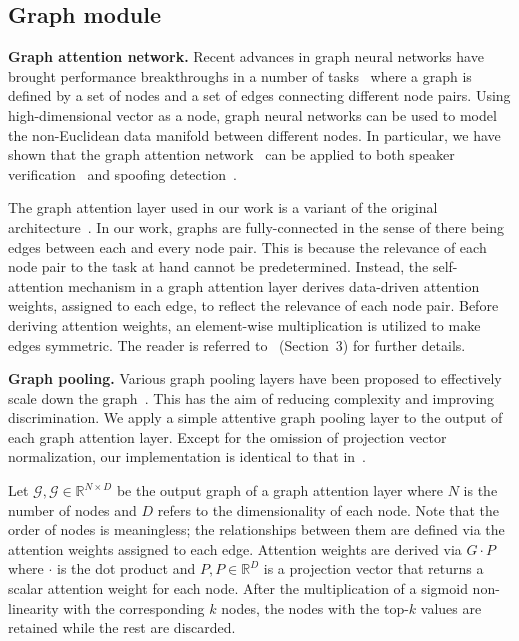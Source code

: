 \documentclass{article}
\newcommand{\newpara}[1]{\vspace{8pt}\noindent\textbf{#1}}
\begin{document}
\subsection{Graph module}
\label{sec:GATandGPool}

\newpara{Graph attention network.}
Recent advances in graph neural networks have brought performance breakthroughs in a number of tasks~\cite{velickovic2018graph,jung2021graph,tak2021graph} where a graph is defined by a set of nodes and a set of edges connecting different node pairs. 
Using high-dimensional vector as a node, graph neural networks can be used to model the non-Euclidean data manifold between different nodes.
In particular, we have shown that the graph attention network~\cite{velickovic2018graph} can be applied to both speaker verification~\cite{jung2021graph} and spoofing detection~\cite{tak2021graph, tak2021end}.

The graph attention layer used in our work is a variant of the original architecture~\cite{velickovic2018graph}.
In our work, graphs are fully-connected in the sense of there being edges between each and every node pair. 
This is because the relevance of each node pair to the task at hand cannot be predetermined. 
Instead, the self-attention mechanism in a graph attention layer derives data-driven attention weights, assigned to each edge, to reflect the relevance of each node pair. 
Before deriving attention weights, an element-wise multiplication is utilized to make edges symmetric.
The reader is referred to~\cite{tak2021end} (Section~3) for further details. 

\newpara{Graph pooling.}
Various graph pooling layers have been proposed to effectively scale down the graph~\cite{lee2019self,gao2019graph}.
This has the aim of reducing complexity and improving discrimination.
We apply a simple attentive graph pooling layer to the output of each graph attention layer. 
Except for the omission of projection vector normalization, our implementation is identical to that in~\cite{gao2019graph}.

Let $\mathcal{G}, \mathcal{G} \in \mathbb{R}^{N \times D}$ be the output graph of a graph attention layer where $N$ is the number of nodes and $D$ refers to the dimensionality of each node. 
Note that the order of nodes is meaningless; the relationships between them are defined via the attention weights assigned to each edge. 
Attention weights are derived via $G \cdot P$ where $\cdot$ is the dot product and $P, P \in \mathbb{R}^{D}$ is a projection vector that returns a scalar attention weight for each node. 
After the multiplication of a sigmoid non-linearity with the corresponding $k$ nodes, the nodes with the top-$k$ values are retained while the rest are discarded. 
\end{document}
